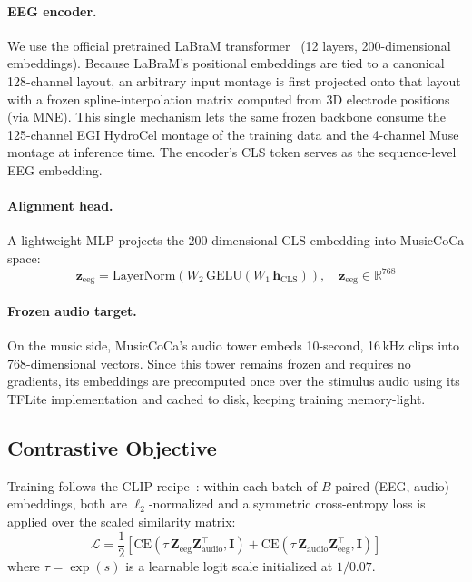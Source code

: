 \documentclass[manuscript,review,anonymous]{acmart}
\begin{document}
\paragraph{EEG encoder.}
We use the official pretrained LaBraM transformer~\cite{labram} (12 layers, 200-dimensional embeddings). Because LaBraM's positional embeddings are tied to a canonical 128-channel layout, an arbitrary input montage is first projected onto that layout with a frozen spline-interpolation matrix computed from 3D electrode positions (via MNE). This single mechanism lets the same frozen backbone consume the 125-channel EGI HydroCel montage of the training data and the 4-channel Muse montage at inference time. The encoder's CLS token serves as the sequence-level EEG embedding.

\paragraph{Alignment head.}
A lightweight MLP projects the 200-dimensional CLS embedding into MusicCoCa space:
\begin{equation}
  \mathbf{z}_{\text{eeg}} = \mathrm{LayerNorm}\!\left(W_2\, \mathrm{GELU}(W_1\, \mathbf{h}_{\text{CLS}})\right), \quad \mathbf{z}_{\text{eeg}} \in \mathbb{R}^{768}
\end{equation}

\paragraph{Frozen audio target.}
On the music side, MusicCoCa's audio tower embeds 10-second, 16\,kHz clips into 768-dimensional vectors. Since this tower remains frozen and requires no gradients, its embeddings are precomputed once over the stimulus audio using its TFLite implementation and cached to disk, keeping training memory-light.

\subsection{Contrastive Objective}

Training follows the CLIP recipe~\cite{clip}: within each batch of $B$ paired (EEG, audio) embeddings, both are $\ell_2$-normalized and a symmetric cross-entropy loss is applied over the scaled similarity matrix:
\begin{equation}
  \mathcal{L} = \frac{1}{2}\left[ \mathrm{CE}\!\left(\tau\, \mathbf{Z}_{\text{eeg}} \mathbf{Z}_{\text{audio}}^\top, \mathbf{I}\right) + \mathrm{CE}\!\left(\tau\, \mathbf{Z}_{\text{audio}} \mathbf{Z}_{\text{eeg}}^\top, \mathbf{I}\right) \right]
\end{equation}
where $\tau = \exp(s)$ is a learnable logit scale initialized at $1/0.07$.
\end{document}
